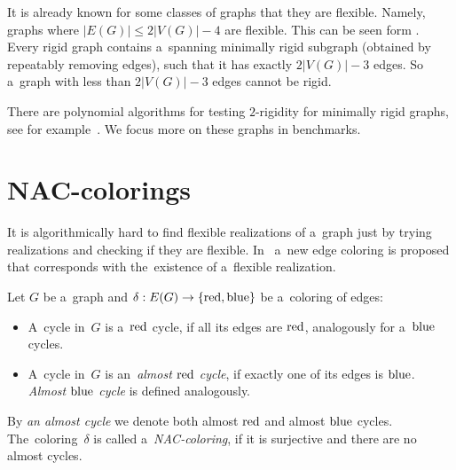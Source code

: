 It is already known for some classes of graphs that they are flexible.
Namely, graphs where \( |E(G)| \le 2|V(G)| - 4 \) are flexible.
This can be seen form .
Every rigid graph contains a~spanning minimally rigid subgraph
(obtained by repeatably removing edges),
such that it has exactly \( 2|V(G)| - 3 \) edges.
So a~graph with less than \( 2|V(G)| - 3 \) edges cannot be rigid.



There are polynomial algorithms for testing \( 2 \)-rigidity
for minimally rigid graphs, see for example~\cite{polynomial-min-rigid}.
We focus more on these graphs in benchmarks.


\section{NAC-colorings}

It is algorithmically hard to find flexible realizations of a~graph
just by trying realizations and checking if they are flexible.
In~\cite{legersky_original} a~new edge coloring is proposed
that corresponds with the~existence of a~flexible realization.

\begin{definition}
	Let \( G \) be a~graph and \( \delta: E(G) \to \{ \text{red}, \text{blue} \} \)
	be a~coloring of edges:
	\begin{itemize}
		\item A~cycle in~\( G \) is a~\( \text{red} \) cycle, if all its edges are \( \text{red} \),
		      analogously for a~\( \text{blue} \) cycles.
		\item A~cycle in~\( G \) is an~\emph{almost \( \text{red} \) cycle},
		      if exactly one of its edges is \( \text{blue} \).
		      \emph{Almost \( \text{blue} \) cycle} is defined analogously.
	\end{itemize}
	By \emph{an almost cycle} we denote both almost \( \text{red} \) and almost \( \text{blue} \) cycles.
	The~coloring~\( \delta \) is called a~\emph{NAC-coloring}, if it is surjective
	and there are no almost cycles.
\end{definition}
%


